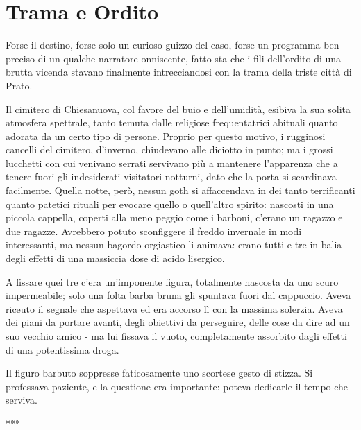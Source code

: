 \chapter{Trama e Ordito}


Forse il destino, forse solo un curioso guizzo del caso, forse un programma ben preciso di un qualche narratore onniscente, fatto sta che i fili dell'ordito di una brutta vicenda stavano finalmente intrecciandosi con la trama della triste città di Prato.

Il cimitero di Chiesanuova, col favore del buio e dell'umidità, esibiva la sua solita atmosfera spettrale, tanto temuta dalle religiose frequentatrici abituali quanto adorata da un certo tipo di persone. Proprio per questo motivo, i rugginosi cancelli del cimitero, d'inverno, chiudevano alle diciotto in punto; ma i grossi lucchetti con cui venivano serrati servivano più a mantenere l'apparenza che a tenere fuori gli indesiderati visitatori notturni, dato che la porta si scardinava facilmente. Quella notte, però, nessun goth si affaccendava in dei tanto terrificanti quanto patetici rituali per evocare quello o quell'altro spirito: nascosti in una piccola cappella, coperti alla meno peggio come i barboni, c'erano un ragazzo e due ragazze. Avrebbero potuto sconfiggere il freddo invernale in modi interessanti, ma nessun bagordo orgiastico li animava: erano tutti e tre in balia degli effetti di una massiccia dose di acido lisergico.

A fissare quei tre c'era un'imponente figura, totalmente nascosta da uno scuro impermeabile; solo una folta barba bruna gli spuntava fuori dal cappuccio. Aveva riceuto il segnale che aspettava ed era accorso lì con la massima solerzia. Aveva dei piani da portare avanti, degli obiettivi da perseguire, delle cose da dire ad un suo vecchio amico - ma lui fissava il vuoto, completamente assorbito dagli effetti di una potentissima droga.

Il figuro barbuto soppresse faticosamente uno scortese gesto di stizza. Si professava paziente, e la questione era importante: poteva dedicarle il tempo che serviva.

***


